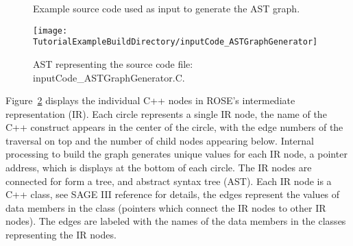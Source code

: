 \begin{figure}[!h]
{\indent
{\mySmallFontSize

\begin{latexonly}
   
\end{latexonly}

\begin{htmlonly}
   
\end{htmlonly}

}
}
\caption{Example source code used as input to generate the AST graph.}
\label{Tutorial:exampleInputCode_ASTGraphGenerator}
\end{figure}

\begin{figure}
\texttt{[image: \\TutorialExampleBuildDirectory/inputCode\_ASTGraphGenerator]}
\caption{AST representing the source code file: inputCode\_ASTGraphGenerator.C.}
\label{tutorial:exampleOutputCodeGraph}
\end{figure}

   Figure~\ref{tutorial:exampleOutputCodeGraph} displays the individual
C++ nodes in ROSE's intermediate representation (IR).  Each circle represents
a single IR node, the name of the C++ construct appears in the center of the
circle, with the edge numbers of the traversal on top and the number of
child nodes appearing below.  Internal processing to build the graph generates
unique values for each IR node, a pointer address, which is displays at the bottom
of each circle.  The IR nodes are connected for form a tree, and abstract syntax
tree (AST). Each IR node is a C++ class, see SAGE III reference for details,
the edges represent the values of data members in the class (pointers which connect
the IR nodes to other IR nodes).  The edges are labeled with the names of the 
data members in the classes representing the IR nodes.





